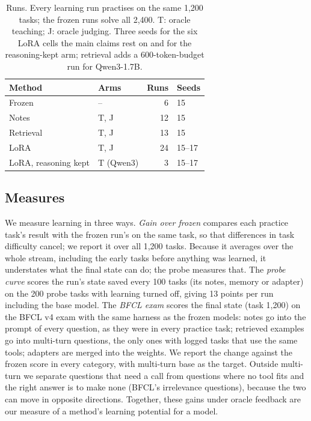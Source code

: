 \documentclass[a4paper,fleqn]{cas-dc}
\begin{document}
\begin{table}[t]
\centering
\caption{Runs. Every learning run practises on the same 1,200 tasks; the frozen runs solve all 2,400. T: oracle
teaching; J: oracle judging. Three seeds for the six LoRA cells the main claims rest on and for the reasoning-kept
arm; retrieval adds a 600-token-budget run for Qwen3-1.7B.}\label{tab:runs}
\small
\begin{tabular}{@{}llrl@{}}
\toprule
Method & Arms & Runs & Seeds \\
\midrule
Frozen                 & --           & 6  & 15 \\
Notes                  & T, J         & 12 & 15 \\
Retrieval              & T, J         & 13 & 15 \\
LoRA                   & T, J         & 24 & 15--17 \\
LoRA, reasoning kept   & T (Qwen3)    & 3  & 15--17 \\
\bottomrule
\end{tabular}
\end{table}

\subsection{Measures}\label{sec:measures}
We measure learning in three ways. \emph{Gain over frozen} compares each practice task's result with the frozen run's on
the same task, so that differences in task difficulty cancel; we report it over all 1,200 tasks. Because it averages
over the whole stream, including the early tasks before anything was learned, it understates what the final state can do;
the probe measures that.
The \emph{probe curve} scores the run's state saved every 100 tasks (its notes, memory or adapter) on the 200 probe tasks
with learning turned off, giving 13 points per run including the base model. The \emph{BFCL exam} scores the final state
(task 1,200) on the BFCL v4 exam with the same harness as the frozen models: notes go into the prompt of every question,
as they were in every practice task;
retrieved examples go into multi-turn questions, the only ones with logged tasks that use the same tools; adapters are
merged into the weights. We report the change against the frozen score in every category, with multi-turn base as the
target. Outside multi-turn we separate questions that need a call from
questions where no tool fits and the right answer is to make none (BFCL's irrelevance questions), because the two can
move in opposite directions. Together, these gains under oracle feedback are our measure of a method's learning
potential for a model.
\end{document}
